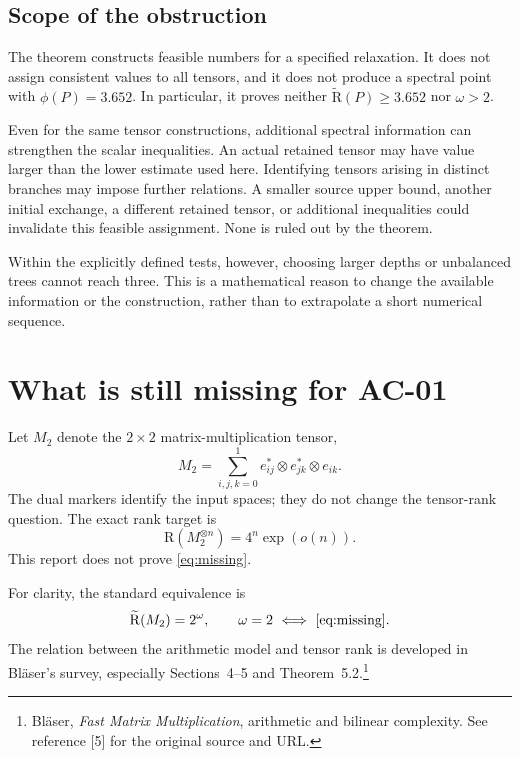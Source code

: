 \documentclass[11pt]{article}
\theoremstyle{definition}\newtheorem{definition}[theorem]{Definition}
\theoremstyle{remark}\newtheorem{remark}[theorem]{Remark}
\newcommand{\AR}{\widetilde{\mathrm R}}
\newcommand{\R}{\mathrm R}
\newcommand{\sref}[2]{\footnote{#1. See reference [#2] for the original source and URL.}}
\begin{document}
\subsection{Scope of the obstruction}

The theorem constructs feasible numbers for a specified relaxation. It does not assign consistent values to all tensors, and it does not produce a spectral point with $\phi(P)=3.652$. In particular, it proves neither $\AR(P)\geq3.652$ nor $\omega>2$.

Even for the same tensor constructions, additional spectral information can strengthen the scalar inequalities. An actual retained tensor may have value larger than the lower estimate used here. Identifying tensors arising in distinct branches may impose further relations. A smaller source upper bound, another initial exchange, a different retained tensor, or additional inequalities could invalidate this feasible assignment. None is ruled out by the theorem.

Within the explicitly defined tests, however, choosing larger depths or unbalanced trees cannot reach three. This is a mathematical reason to change the available information or the construction, rather than to extrapolate a short numerical sequence.

\section{What is still missing for AC-01}\label{sec:gap}

Let $M_2$ denote the $2\times2$ matrix-multiplication tensor,
\[
 M_2=\sum_{i,j,k=0}^{1}e_{ij}^{*}\otimes e_{jk}^{*}\otimes e_{ik}.
\]
The dual markers identify the input spaces; they do not change the tensor-rank question. The exact rank target is
\begin{equation}\label{eq:missing}
 \boxed{\R(M_2^{\otimes n})=4^n\exp(o(n)).}
\end{equation}
This report does not prove \eqref{eq:missing}.

For clarity, the standard equivalence is
\begin{equation}\label{eq:omega-equivalence}
 \AR(M_2)=2^\omega,\qquad
 \omega=2\ \Longleftrightarrow\ \eqref{eq:missing}.
\end{equation}
The relation between the arithmetic model and tensor rank is developed in Bl\"aser's survey, especially Sections~4--5 and Theorem~5.2.\sref{Bl\"aser, \emph{Fast Matrix Multiplication}, arithmetic and bilinear complexity}{5}
\end{document}
